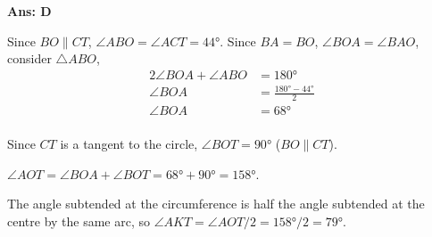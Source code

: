 \documentclass[border=3pt,varwidth=70mm]{standalone}
\begin{document}
\begin{answer}
\hrulefill\par
\textbf{Ans: D}

Since $BO\parallel CT$, $\angle ABO=\angle ACT=\ang{44}$. Since $BA=BO$, $\angle BOA = \angle BAO$, consider $\bigtriangleup ABO$,
\begin{equation*}
\begin{aligned}
2\angle BOA + \angle ABO &= \ang{180} \\
\angle BOA &= \frac{\ang{180}-\ang{44}}{2} \\
\angle BOA &= \ang{68} \\
\end{aligned}
\end{equation*}

Since $CT$ is a tangent to the circle, $\angle BOT=\ang{90}$ ($BO\parallel CT$).

$\angle AOT=\angle BOA + \angle BOT = \ang{68}+\ang{90} = \ang{158}$.

The angle subtended at the circumference is half the angle subtended at the centre by the same arc, so $\angle AKT = \angle AOT / 2 = \ang{158}/2 = \ang{79}$. 

\end{answer}
\end{document}
